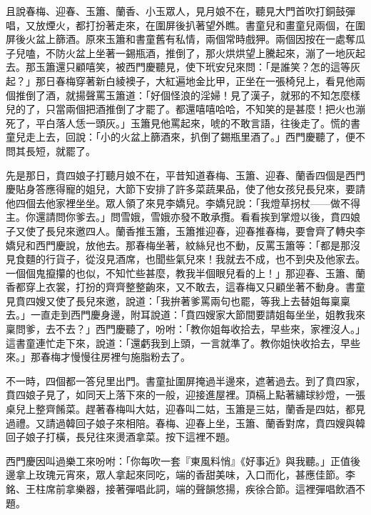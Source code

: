 且說春梅、迎春、玉簫、蘭香、小玉眾人，見月娘不在，聽見大門首吹打銅鼓彈唱，又放煙火，都打扮著走來，在圍屏後扒著望外瞧。書童兒和畫童兒兩個，在圍屏後火盆上篩酒。原來玉簫和書童舊有私情，兩個常時戲狎。兩個因按在一處奪瓜子兒嗑，不防火盆上坐著一錫瓶酒，推倒了，那火烘烘望上騰起來，漰了一地灰起去。那玉簫還只顧嘻笑，被西門慶聽見，使下玳安兒來問：「是誰笑？怎的這等灰起？」那日春梅穿著新白綾襖子，大紅遍地金比甲，正坐在一張椅兒上，看見他兩個推倒了酒，就揚聲罵玉簫道：「好個怪浪的淫婦！見了漢子，就邪的不知怎麼樣兒的了，只當兩個把酒推倒了才罷了。都還嘻嘻哈哈，不知笑的是甚麼！把火也漰死了，平白落人恁一頭灰。」玉簫見他罵起來，唬的不敢言語，往後走了。慌的書童兒走上去，回說：「小的火盆上篩酒來，扒倒了錫瓶里酒了。」西門慶聽了，便不問其長短，就罷了。

先是那日，賁四娘子打聽月娘不在，平昔知道春梅、玉簫、迎春、蘭香四個是西門慶貼身答應得寵的姐兒，大節下安排了許多菜蔬果品，使了他女孩兒長兒來，要請他四個去他家裡坐坐。眾人領了來見李嬌兒。李嬌兒說：「我燈草拐杖——做不得主。你還請問你爹去。」問雪娥，雪娥亦發不敢承攬。看看挨到掌燈以後，賁四娘子又使了長兒來邀四人。蘭香推玉簫，玉簫推迎春，迎春推春梅，要會齊了轉央李嬌兒和西門慶說，放他去。那春梅坐著，紋絲兒也不動，反罵玉簫等：「都是那沒見食麵的行貨子，從沒見酒席，也聞些氣兒來！我就去不成，也不到央及他家去。一個個鬼攛攥的也似，不知忙些甚麼，教我半個眼兒看的上！」那迎春、玉簫、蘭香都穿上衣裳，打扮的齊齊整整齣來，又不敢去，這春梅又只顧坐著不動身。書童見賁四嫂又使了長兒來邀，說道：「我拚著爹罵兩句也罷，等我上去替姐每稟稟去。」一直走到西門慶身邊，附耳說道：「賁四嫂家大節間要請姐每坐坐，姐教我來稟問爹，去不去？」西門慶聽了，吩咐：「教你姐每收拾去，早些來，家裡沒人。」這書童連忙走下來，說道：「還虧我到上頭，一言就準了。教你姐快收拾去，早些來。」那春梅才慢慢往房裡勻施脂粉去了。

不一時，四個都一答兒里出門。書童扯圍屏掩過半邊來，遮著過去。到了賁四家，賁四娘子見了，如同天上落下來的一般，迎接進屋裡。頂槅上點著繡球紗燈，一張桌兒上整齊餚菜。趕著春梅叫大姑，迎春叫二姑，玉簫是三姑，蘭香是四姑，都見過禮。又請過韓回子娘子來相陪。春梅、迎春上坐，玉簫、蘭香對席，賁四嫂與韓回子娘子打橫，長兒往來燙酒拿菜。按下這裡不題。

西門慶因叫過樂工來吩咐：「你每吹一套『東風料悄』《好事近》與我聽。」正值後邊拿上玫瑰元宵來，眾人拿起來同吃，端的香甜美味，入口而化，甚應佳節。李銘、王柱席前拿樂器，接著彈唱此詞，端的聲韻悠揚，疾徐合節。這裡彈唱飲酒不題。

